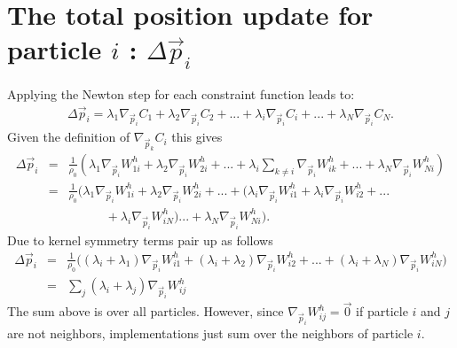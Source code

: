 \documentclass[8pt]{article}
\begin{document}
\section*{\sf The total position update for particle $i$ : $\Delta \vec{p}_i$}
Applying the Newton step for each constraint function leads to:
\begin{eqnarray}
  \Delta \vec{p}_i = \lambda_1\nabla_{\vec{p}_i}C_1 + \lambda_2\nabla_{\vec{p}_i}C_2 + ... +\lambda_i\nabla_{\vec{p}_i}C_i + ... +\lambda_N\nabla_{\vec{p}_i}C_N.
\end{eqnarray}
Given the definition of $\nabla_{\vec{p}_k}C_i$ this gives
\begin{eqnarray*}
  \Delta \vec{p}_i &=& \frac{1}{\rho_0}\left(\lambda_1\nabla_{\vec{p}_i}W^h_{1i} + \lambda_2\nabla_{\vec{p}_i}W^h_{2i} + ... + \lambda_i\sum_{k\neq i}\nabla_{\vec{p}_i}W^h_{ik} + ... + \lambda_N\nabla_{\vec{p}_i}W^h_{Ni}\right)\\
  &=& \frac{1}{\rho_0}{\Big(}\lambda_1\nabla_{\vec{p}_i}W^h_{1i} + \lambda_2\nabla_{\vec{p}_i}W^h_{2i} + ... + (\lambda_i\nabla_{\vec{p}_i}W^h_{i1} + \lambda_i\nabla_{\vec{p}_i}W^h_{i2} +  ... \\
  && \quad \quad \quad + \lambda_i\nabla_{\vec{p}_i}W^h_{iN} )... + \lambda_N\nabla_{\vec{p}_i}W^h_{Ni}{\Big).}
\end{eqnarray*}
Due to kernel symmetry terms pair up as follows
\begin{eqnarray*}
   \Delta \vec{p}_i &=& \frac{1}{\rho_0}\Big((\lambda_i + \lambda_1)\nabla_{\vec{p}_i}W^h_{i1} + (\lambda_i + \lambda_2)\nabla_{\vec{p}_i}W^h_{i2} + ... + (\lambda_i + \lambda_N)\nabla_{\vec{p}_i}W^h_{iN}\Big)\\
           &=& \sum_j(\lambda_i + \lambda_j)\nabla_{\vec{p}_i}W^h_{ij}
\end{eqnarray*}
The sum above is over all particles. However, since $\nabla_{\vec{p}_i}W^h_{ij} = \vec{0}$ if particle $i$ and $j$ are not neighbors, implementations just sum over the neighbors of particle $i$. 
\end{document}
